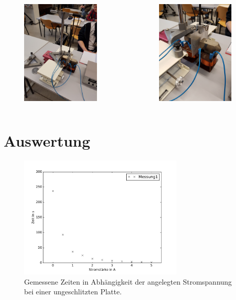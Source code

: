\begin{frame}

  \begin{columns}[onlytextwidth]
    \begin{column}{0.45\textwidth}
      \begin{figure}
        \centering
        \includegraphics[height=5cm, angle = -90]{20170306_101228.jpg}
      \end{figure}
    \end{column}
    \begin{column}{0.45\textwidth}
      \begin{figure}
        \centering
        \includegraphics[height=5cm, angle = -90]{20170306_101230.jpg}
      \end{figure}
    \end{column}
  \end{columns}

\end{frame}

\section{Auswertung}

\begin{frame}
  \begin{figure}
    \includegraphics[width = 0.7\textwidth]{Messung1.pdf}
    \caption{Gemessene Zeiten in Abhängigkeit der angelegten Stromspannung bei einer ungeschlitzten Platte.}
  \end{figure}
\end{frame}

